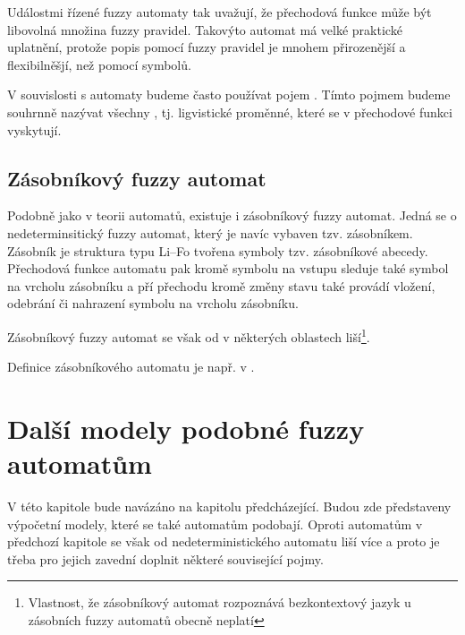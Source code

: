 \documentclass[a4paper,10pt]{article}
\begin{document}
Událostmi řízené fuzzy automaty tak uvažují, že přechodová funkce může být libovolná množina fuzzy \ifthen pravidel.  Takovýto automat má velké praktické uplatnění, protože popis pomocí fuzzy \ifthen pravidel je mnohem přirozenější a flexibilněšjí, než pomocí symbolů.

\begin{note}
 V souvislosti s automaty budeme často používat pojem . Tímto pojmem budeme souhrnně nazývat všechny , tj. ligvistické proměnné, které se v přechodové funkci vyskytují.
\end{note}


\subsection{Zásobníkový fuzzy automat}
Podobně jako v  teorii automatů, existuje i zásobníkový fuzzy automat. Jedná se o nedeterminsitický fuzzy automat, který je navíc vybaven tzv. zásobníkem. Zásobník je struktura typu Li--Fo tvořena symboly tzv. zásobníkové abecedy. Přechodová funkce automatu pak kromě symbolu na vstupu sleduje také symbol na vrcholu zásobníku a pří přechodu kromě změny stavu také provádí vložení, odebrání či nahrazení symbolu na vrcholu zásobníku.

Zásobníkový fuzzy automat se však od  v některých oblastech liší\footnote{Vlastnost, že zásobníkový automat rozpoznává bezkontextový jazyk u zásobních fuzzy automatů obecně neplatí}. 

Definice zásobníkového automatu je např. v \cite{BucPas-FuzPusAut}.

\section{Další modely podobné fuzzy automatům}
V této kapitole bude navázáno na kapitolu předcházející. Budou zde představeny výpočetní modely, které se také automatům podobají. Oproti automatům v předchozí kapitole se však od  nedeterministického automatu liší více a proto je třeba pro jejich zavední doplnit některé související pojmy. 
\end{document}
